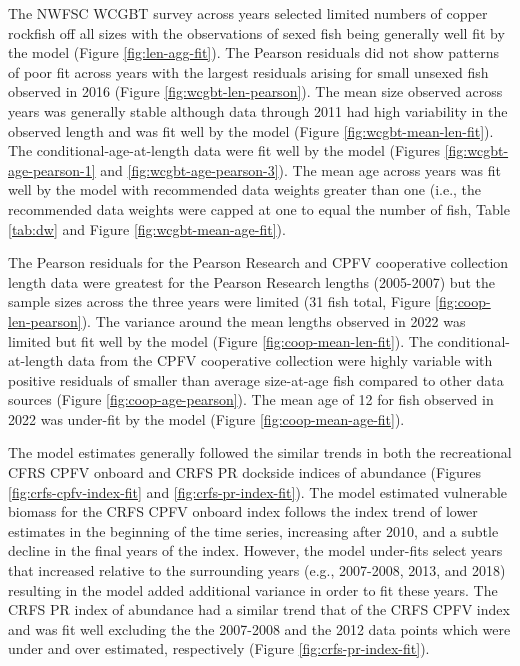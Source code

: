\documentclass[11pt,
  english,
  letterpaper,
]{article}
\begin{document}
The NWFSC WCGBT survey across years selected limited numbers of copper rockfish off all sizes with the observations of sexed fish being generally well fit by the model (Figure \ref{fig:len-agg-fit}). The Pearson residuals did not show patterns of poor fit across years with the largest residuals arising for small unsexed fish observed in 2016 (Figure \ref{fig:wcgbt-len-pearson}). The mean size observed across years was generally stable although data through 2011 had high variability in the observed length and was fit well by the model (Figure \ref{fig:wcgbt-mean-len-fit}). The conditional-age-at-length data were fit well by the model (Figures \ref{fig:wcgbt-age-pearson-1} and \ref{fig:wcgbt-age-pearson-3}). The mean age across years was fit well by the model with recommended data weights greater than one (i.e., the recommended data weights were capped at one to equal the number of fish, Table \ref{tab:dw} and Figure \ref{fig:wcgbt-mean-age-fit}).

The Pearson residuals for the Pearson Research and CPFV cooperative collection length data were greatest for the Pearson Research lengths (2005-2007) but the sample sizes across the three years were limited (31 fish total, Figure \ref{fig:coop-len-pearson}). The variance around the mean lengths observed in 2022 was limited but fit well by the model (Figure \ref{fig:coop-mean-len-fit}). The conditional-at-length data from the CPFV cooperative collection were highly variable with positive residuals of smaller than average size-at-age fish compared to other data sources (Figure \ref{fig:coop-age-pearson}). The mean age of 12 for fish observed in 2022 was under-fit by the model (Figure \ref{fig:coop-mean-age-fit}).

The model estimates generally followed the similar trends in both the recreational CFRS CPFV onboard and CRFS PR dockside indices of abundance (Figures \ref{fig:crfs-cpfv-index-fit} and \ref{fig:crfs-pr-index-fit}). The model estimated vulnerable biomass for the CRFS CPFV onboard index follows the index trend of lower estimates in the beginning of the time series, increasing after 2010, and a subtle decline in the final years of the index. However, the model under-fits select years that increased relative to the surrounding years (e.g., 2007-2008, 2013, and 2018) resulting in the model added additional variance in order to fit these years. The CRFS PR index of abundance had a similar trend that of the CRFS CPFV index and was fit well excluding the the 2007-2008 and the 2012 data points which were under and over estimated, respectively (Figure \ref{fig:crfs-pr-index-fit}).
\end{document}
